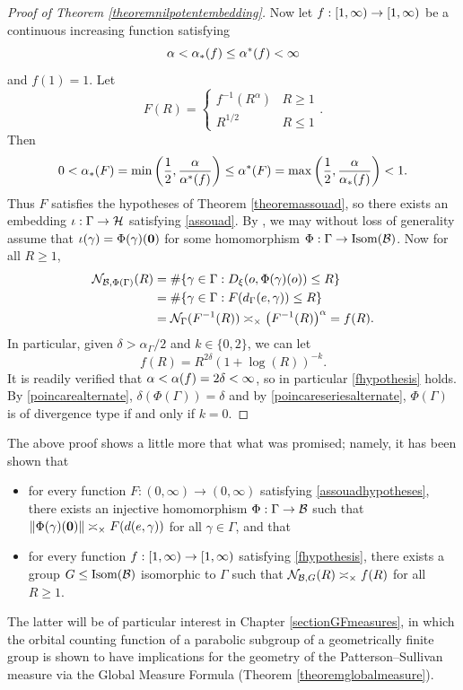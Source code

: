 \begin{proof}[Proof of Theorem \ref{theoremnilpotentembedding}]
Now let $f:[1,\infty)\to [1,\infty)$ be a continuous increasing function satisfying
\begin{equation}
\label{fhypothesis}
\alpha < \alpha_*(f) \leq \alpha^*(f) < \infty
\end{equation}
and $f(1) = 1$. Let
\[
F(R) = \begin{cases}
f^{-1}(R^\alpha) & R \geq 1\\
R^{1/2} & R \leq 1
\end{cases}.
\]
Then
\[
0 < \alpha_*(F) = \min\left(\frac12,\frac{\alpha}{\alpha^*(f)}\right) \leq \alpha^*(F) = \max\left(\frac12,\frac{\alpha}{\alpha_*(f)}\right) < 1.
\]
Thus $F$ satisfies the hypotheses of Theorem \ref{theoremassouad}, so there exists an embedding $\iota:\Gamma\to\mathcal H$ satisfying \eqref{assouad}. By \cite[Proposition 4.4]{CTV1}, we may without loss of generality assume that $\iota(\gamma) = \Phi(\gamma)(\mathbf 0)$ for some homomorphism $\Phi:\Gamma\to\operatorname{Isom}(\mathcal B)$. Now for all $R\geq 1$,
\begin{align*}
\mathcal N_{\mathcal B,\Phi(\Gamma)}(R) &= \#\{\gamma\in\Gamma : D_\xi(o,\Phi(\gamma)(o)) \leq R\}\\
&= \#\{\gamma\in\Gamma : F(d_\Gamma(e,\gamma)) \leq R\}\\
&= \mathcal N_\Gamma(F^{-1}(R)) \asymp_\times \big(F^{-1}(R)\big)^\alpha = f(R).
\end{align*}
In particular, given $\delta > \alpha_\Gamma/2$ and $k\in \{0,2\}$, we can let 
\[
f(R) = R^{2\delta} (1 + \log(R))^{-k}.
\] 
It is readily verified that $\alpha < \alpha(f) = 2\delta < \infty$, so in particular \eqref{fhypothesis} holds. By \eqref{poincarealternate}, $\delta(\Phi(\Gamma)) = \delta$ and by \eqref{poincareseriesalternate}, $\Phi(\Gamma)$ is of divergence type if and only if $k = 0$.
\end{proof}
\begin{remark}
\label{remarknilpotentembedding3}
The above proof shows a little more that what was promised; namely, it has been shown that
\begin{itemize}
\item[(i)] for every function $F:(0,\infty)\to(0,\infty)$ satisfying \eqref{assouadhypotheses}, there exists an injective homomorphism $\Phi:\Gamma\to \mathcal B$ such that $\|\Phi(\gamma)(\mathbf 0)\| \asymp_\times F(d(e,\gamma))$ for all $\gamma\in \Gamma$, and that
\item[(ii)] for every function $f:[1,\infty)\to [1,\infty)$ satisfying \eqref{fhypothesis}, there exists a group $G\leq\operatorname{Isom}(\mathcal B)$ isomorphic to $\Gamma$ such that $\mathcal N_{\mathcal B,G}(R) \asymp_\times f(R)$ for all $R\geq 1$.
\end{itemize}
The latter will be of particular interest in Chapter \ref{sectionGFmeasures}, in which the orbital counting function of a parabolic subgroup of a geometrically finite group is shown to have implications for the geometry of the Patterson--Sullivan measure via the Global Measure Formula (Theorem \ref{theoremglobalmeasure}).
\end{remark}


